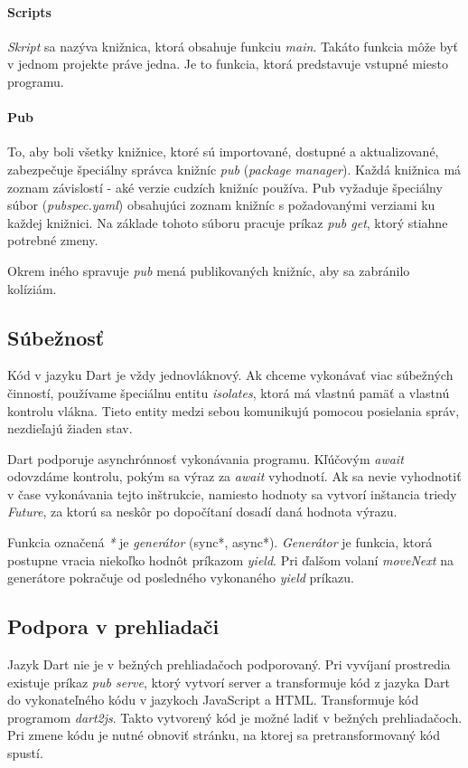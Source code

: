\paragraph{Scripts}
\emph{Skript} sa nazýva knižnica, ktorá obsahuje funkciu \emph{main}. Takáto funkcia môže byť v jednom projekte práve jedna. Je to funkcia, ktorá predstavuje vstupné miesto programu.

\paragraph{Pub}
To, aby boli všetky knižnice, ktoré sú importované, dostupné a aktualizované, zabezpečuje špeciálny správca knižníc \emph{pub} (\emph{package manager}). 
Každá knižnica má zoznam závislostí - aké verzie cudzích knižníc používa. 
Pub vyžaduje špeciálny súbor (\emph{pubspec.yaml}) obsahujúci zoznam knižníc s požadovanými verziami ku každej knižnici. Na základe tohoto súboru pracuje príkaz \emph{pub get}, ktorý stiahne potrebné zmeny.

Okrem iného spravuje \emph{pub} mená publikovaných knižníc, aby sa zabránilo kolíziám.

\subsection{Súbežnosť}%
Kód v jazyku Dart je vždy jednovláknový. Ak chceme vykonávať viac súbežných činností, používame špeciálnu entitu \emph{isolates}, ktorá má vlastnú pamäť a vlastnú kontrolu vlákna. Tieto entity medzi sebou komunikujú pomocou posielania správ, nezdieľajú žiaden stav.

Dart podporuje asynchrónnosť vykonávania programu. Kľúčovým \emph{await} odovzdáme kontrolu, pokým sa výraz za \emph{await} vyhodnotí. Ak sa nevie vyhodnotiť v čase vykonávania tejto inštrukcie, namiesto hodnoty sa vytvorí inštancia triedy \emph{Future}, za ktorú sa neskôr po dopočítaní dosadí daná hodnota výrazu.%

Funkcia označená \emph{*} je \emph{generátor} (sync*, async*). \emph{Generátor} je funkcia, ktorá postupne vracia niekoľko hodnôt príkazom \emph{yield}. Pri ďalšom volaní \emph{moveNext} na generátore pokračuje od posledného vykonaného \emph{yield} príkazu.

\subsection{Podpora v prehliadači}
Jazyk Dart nie je v bežných prehliadačoch podporovaný. Pri vyvíjaní prostredia existuje príkaz \emph{pub serve}, ktorý vytvorí server a transformuje kód z jazyka Dart do vykonateľného kódu v jazykoch JavaScript a HTML. Transformuje kód programom \emph{dart2js}. Takto vytvorený kód je možné ladiť v bežných prehliadačoch. Pri zmene kódu je nutné obnoviť stránku, na ktorej sa pretransformovaný kód spustí.


